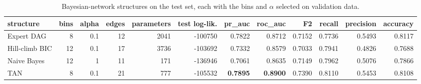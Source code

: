 \begin{table}[H]
\centering
\scriptsize
\begin{adjustbox}{max width=\linewidth}
\begin{tabular}{lrrrrrrrrrrr}
\toprule
structure & bins & alpha & edges & parameters & test log-lik. & pr\_auc & roc\_auc & F2 & recall & precision & accuracy \\
\midrule
Expert DAG & 8 & 0.1 & 12 & 2041 & -100750 & 0.7822 & 0.8712 & 0.7152 & 0.7736 & 0.5493 & 0.8117 \\
Hill-climb BIC & 12 & 0.1 & 17 & 3736 & -103692 & 0.7332 & 0.8579 & 0.7033 & 0.7941 & 0.4826 & 0.7688 \\
Naive Bayes & 12 & 1 & 11 & 171 & -136946 & 0.7061 & 0.8635 & 0.7149 & 0.7962 & 0.5076 & 0.7866 \\
TAN & 8 & 0.1 & 21 & 777 & -105532 & \textbf{0.7895} & \textbf{0.8900} & 0.7390 & 0.8110 & 0.5453 & 0.8108 \\
\bottomrule
\end{tabular}
\end{adjustbox}
\caption{Bayesian-network structures on the test set, each with the bins and $\alpha$ selected on validation data.}
\label{tab:bn_results}
\end{table}
